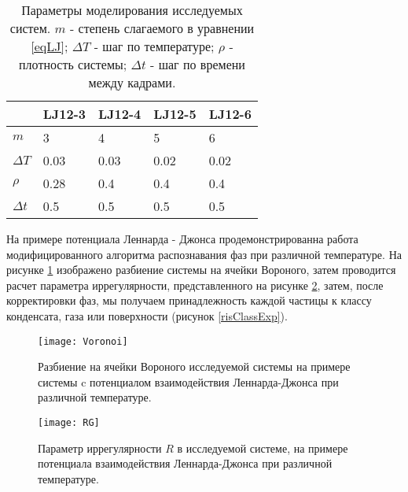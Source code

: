\begin{table}[h]
\begin{center}
\begin{tabular}{| l | l | l | l | l |}
\hline
    & LJ12-3 & LJ12-4 & LJ12-5 & LJ12-6 \\ \hline
$m$   &    3    &     4   &    5    &    6    \\ \hline
$\Delta T$ & 0.03 & 0.03 & 0.02 & 0.02 \\ \hline
$\rho$ & 0.28  &  0.4  &  0.4  &  0.4  \\ \hline
$\Delta t$ & 0.5 & 0.5 & 0.5 & 0.5 \\ \hline
\end{tabular}
\end{center}
\caption{Параметры моделирования исследуемых систем. $m$ - степень слагаемого в уравнении \ref{eqLJ}; $\Delta T$ - шаг по температуре;  $\rho$ - плотность системы; $\Delta t$ - шаг по времени между кадрами.}
\label{tablParam}
\end{table}

На примере потенциала Леннарда - Джонса продемонстрированна работа модифицированного алгоритма распознавания фаз при различной температуре. На рисунке \ref{risvoronoiExp} изображено разбиение системы на ячейки Вороного, затем проводится расчет параметра иррегулярности, представленного на рисунке \ref{risIregExp}, затем, после корректировки фаз, мы получаем принадлежность каждой частицы к классу конденсата, газа или поверхности (рисунок \ref{risClassExp}).


\begin{figure}[h]
\begin{center}
\texttt{[image: Voronoi]}
\caption{Разбиение на ячейки Вороного исследуемой системы на примере системы c потенциалом взаимодействия Леннарда-Джонса при различной температуре.}
\label{risvoronoiExp}
\end{center}
\end{figure}



\begin{figure}[h]
\begin{center}
\texttt{[image: RG]}
\caption{Параметр иррегулярности $R$ в исследуемой системе, на примере потенциала взаимодействия Леннарда-Джонса при различной температуре.}
\label{risIregExp}
\end{center}
\end{figure}




